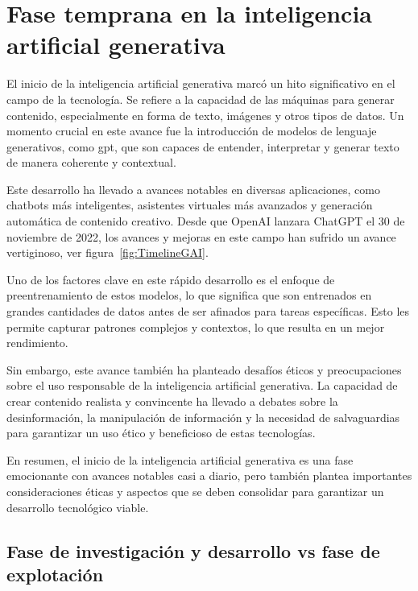 \section{Fase temprana en la inteligencia artificial generativa}

El inicio de la inteligencia artificial generativa marcó un hito significativo en el campo de la tecnología. Se refiere a la capacidad de las máquinas para generar contenido, especialmente en forma de texto, imágenes y otros tipos de datos. Un momento crucial en este avance fue la introducción de modelos de lenguaje generativos, como \acrfull{gpt}, que son capaces de entender, interpretar y generar texto de manera coherente y contextual.

Este desarrollo ha llevado a avances notables en diversas aplicaciones, como chatbots más inteligentes, asistentes virtuales más avanzados y generación automática de contenido creativo. Desde que OpenAI lanzara ChatGPT el 30 de noviembre de 2022, los avances y mejoras en este campo han sufrido un avance vertiginoso, ver figura~\ref{fig:TimelineGAI}. 


Uno de los factores clave en este rápido desarrollo es el enfoque de preentrenamiento de estos modelos, lo que significa que son entrenados en grandes cantidades de datos antes de ser afinados para tareas específicas. Esto les permite capturar patrones complejos y contextos, lo que resulta en un mejor rendimiento.

Sin embargo, este avance también ha planteado desafíos éticos y preocupaciones sobre el uso responsable de la inteligencia artificial generativa. La capacidad de crear contenido realista y convincente ha llevado a debates sobre la desinformación, la manipulación de información y la necesidad de salvaguardias para garantizar un uso ético y beneficioso de estas tecnologías.

En resumen, el inicio de la inteligencia artificial generativa es una fase emocionante con avances notables casi a diario, pero también plantea importantes consideraciones éticas y aspectos que se deben consolidar para garantizar un desarrollo tecnológico viable.

\subsection{Fase de investigación y desarrollo vs fase de explotación}

